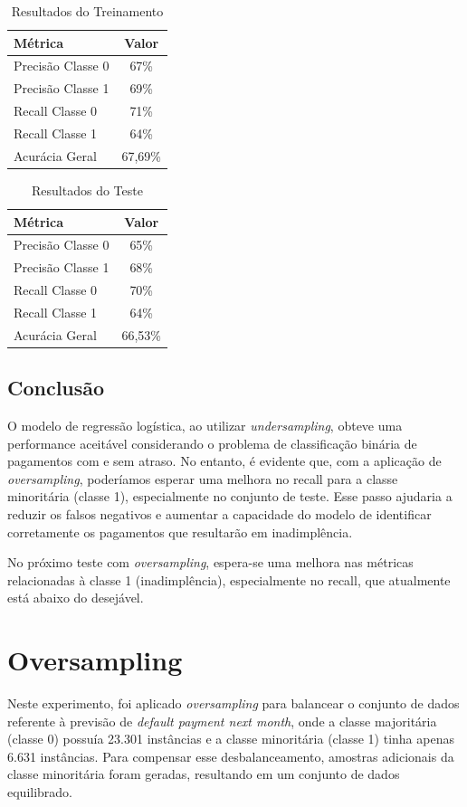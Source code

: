\documentclass{abntpuc}
\begin{document}
\begin{table}[H]
\centering
\begin{tabular}{|l|c|}
\hline
Métrica & Valor \\
\hline
Precisão Classe 0 & 67\% \\
Precisão Classe 1 & 69\% \\
Recall Classe 0 & 71\% \\
Recall Classe 1 & 64\% \\
Acurácia Geral & 67,69\% \\
\hline
\end{tabular}
\caption{Resultados do Treinamento}
\label{tab:resultados_treinamento}
\end{table}

\begin{table}[H]
\centering
\begin{tabular}{|l|c|}
\hline
Métrica & Valor \\
\hline
Precisão Classe 0 & 65\% \\
Precisão Classe 1 & 68\% \\
Recall Classe 0 & 70\% \\
Recall Classe 1 & 64\% \\
Acurácia Geral & 66,53\% \\
\hline
\end{tabular}
\caption{Resultados do Teste}
\label{tab:resultados}
\end{table}

\subsection*{\centering\large\textbf{Conclusão}}

O modelo de regressão logística, ao utilizar \textit{undersampling}, obteve uma performance aceitável considerando o problema de classificação binária de pagamentos com e sem atraso. No entanto, é evidente que, com a aplicação de \textit{oversampling}, poderíamos esperar uma melhora no recall para a classe minoritária (classe 1), especialmente no conjunto de teste. Esse passo ajudaria a reduzir os falsos negativos e aumentar a capacidade do modelo de identificar corretamente os pagamentos que resultarão em inadimplência.

No próximo teste com \textit{oversampling}, espera-se uma melhora nas métricas relacionadas à classe 1 (inadimplência), especialmente no recall, que atualmente está abaixo do desejável.

\section{Oversampling}
Neste experimento, foi aplicado \textit{oversampling} para balancear o conjunto de dados referente à previsão de \textit{default payment next month}, onde a classe majoritária (classe 0) possuía 23.301 instâncias e a classe minoritária (classe 1) tinha apenas 6.631 instâncias. Para compensar esse desbalanceamento, amostras adicionais da classe minoritária foram geradas, resultando em um conjunto de dados equilibrado.
\end{document}
